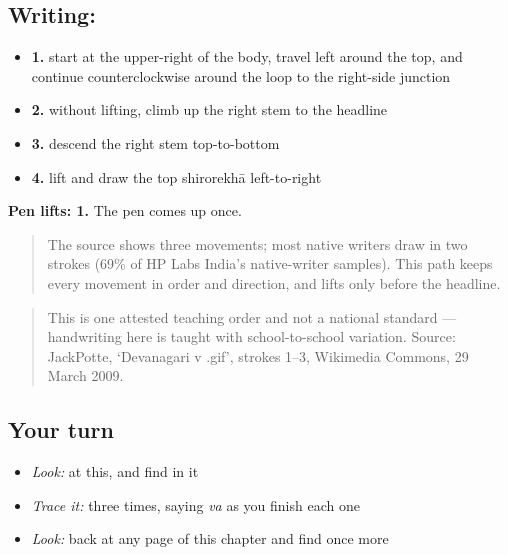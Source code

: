 \subsection*{Writing: }

\begin{itemize}
\raggedright
  \item \textbf{1.} start at the upper-right of the body, travel left around the top, and continue counterclockwise around the loop to the right-side junction
  \item \textbf{2.} without lifting, climb up the right stem to the headline
  \item \textbf{3.} descend the right stem top-to-bottom
  \item \textbf{4.} lift and draw the top shirorekhā left-to-right
\end{itemize}

\textbf{Pen lifts: 1.} The pen comes up once.

\begin{quote}
The source shows three movements; most native writers draw  in two strokes (69\% of HP Labs India's native-writer samples). This path keeps every movement in order and direction, and lifts only before the headline.
\end{quote}

\begin{quote}
This is one attested teaching order and not a national standard — handwriting here is taught with school-to-school variation. Source: JackPotte, ‘Devanagari v .gif’, strokes 1–3, Wikimedia Commons, 29 March 2009.
\end{quote}

\subsection*{Your turn}
\begin{itemize}
\raggedright
  \item \emph{Look:} at this, and find  in it
\end{itemize}

\begin{quote}
\end{quote}

\begin{itemize}
\raggedright
  \item \emph{Trace it:}  three times, saying \emph{va} as you finish each one
  \item \emph{Look:} back at any page of this chapter and find  once more
\end{itemize}

